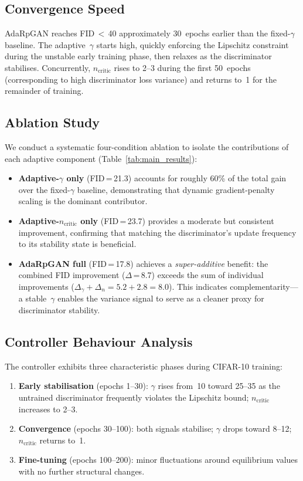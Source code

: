 \documentclass[journal]{IEEEtran}
\newcommand{\ncritic}{n_{\mathrm{critic}}}
\begin{document}
\subsection{Convergence Speed}

AdaRpGAN reaches FID\,$<$\,40 approximately 30~epochs earlier than the fixed-$\gamma$ baseline. The adaptive~$\gamma$ starts high, quickly enforcing the Lipschitz constraint during the unstable early training phase, then relaxes as the discriminator stabilises. Concurrently, $\ncritic$ rises to 2--3 during the first 50~epochs (corresponding to high discriminator loss variance) and returns to~1 for the remainder of training.

\subsection{Ablation Study}

We conduct a systematic four-condition ablation to isolate the contributions of each adaptive component (Table~\ref{tab:main_results}):

\begin{itemize}
    \item \textbf{Adaptive-$\gamma$ only} (FID\,=\,21.3) accounts for roughly 60\% of the total gain over the fixed-$\gamma$ baseline, demonstrating that dynamic gradient-penalty scaling is the dominant contributor.
    \item \textbf{Adaptive-$\ncritic$ only} (FID\,=\,23.7) provides a moderate but consistent improvement, confirming that matching the discriminator's update frequency to its stability state is beneficial.
    \item \textbf{AdaRpGAN full} (FID\,=\,17.8) achieves a \emph{super-additive} benefit: the combined FID improvement ($\Delta$\,=\,8.7) exceeds the sum of individual improvements ($\Delta_\gamma + \Delta_n = 5.2 + 2.8 = 8.0$). This indicates complementarity---a stable~$\gamma$ enables the variance signal to serve as a cleaner proxy for discriminator stability.
\end{itemize}

\subsection{Controller Behaviour Analysis}

The controller exhibits three characteristic phases during CIFAR-10 training:

\begin{enumerate}
    \item \textbf{Early stabilisation} (epochs 1--30): $\gamma$ rises from~10 toward 25--35 as the untrained discriminator frequently violates the Lipschitz bound; $\ncritic$ increases to 2--3.
    \item \textbf{Convergence} (epochs 30--100): both signals stabilise; $\gamma$ drops toward 8--12; $\ncritic$ returns to~1.
    \item \textbf{Fine-tuning} (epochs 100--200): minor fluctuations around equilibrium values with no further structural changes.
\end{enumerate}
\end{document}
